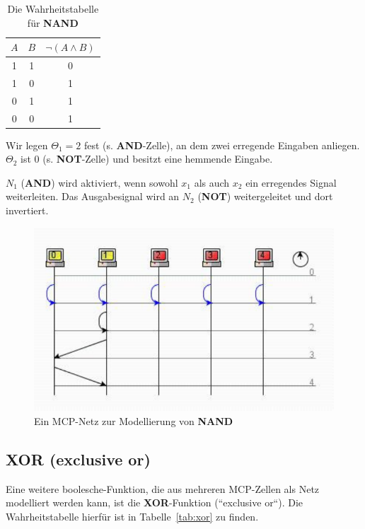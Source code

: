 {\begin{table} %
    \centering
    \begin{tabular}{c | c | c}
        $A$ & $B$ & $\neg(A \land B)$ \\
        \hline
        1   & 1   & 0           \\
        1   & 0   & 1           \\
        0   & 1   & 1           \\
        0   & 0   & 1           \\
    \end{tabular}
    \caption{Die Wahrheitstabelle für \textbf{NAND}}
    \label{tab:nand}
\end{table}


Wir legen $\Theta_1 = 2$ fest (s. \textbf{AND}-Zelle), an dem zwei erregende Eingaben anliegen. $\Theta_2$ ist $0$ (s. \textbf{NOT}-Zelle) und besitzt eine hemmende Eingabe.

$N_1$ (\textbf{AND}) wird aktiviert, wenn sowohl $x_1$ als auch $x_2$ ein erregendes Signal weiterleiten. Das Ausgabesignal wird an $N_2$ (\textbf{NOT}) weitergeleitet und dort invertiert.


\begin{figure}[h]
    \centering
    \includegraphics{images/p1ReadSeq.pdf}
    \caption{Ein MCP-Netz zur Modellierung von \textbf{NAND}}
    \label{fig-mcpnand}
\end{figure}


\subsection*{XOR (exclusive or)}

Eine weitere boolesche-Funktion, die aus mehreren MCP-Zellen als Netz modelliert werden kann, ist die \textbf{XOR}-Funktion (``exclusive or``). Die Wahrheitstabelle hierfür ist in Tabelle~\ref{tab:xor} zu finden.

}
